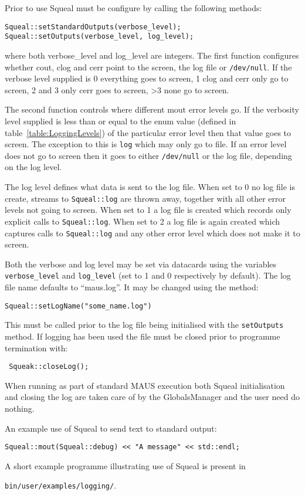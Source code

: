 Prior to use Squeal must be configure by calling the following methods:

\begin{lstlisting}
Squeal::setStandardOutputs(verbose_level);
Squeal::setOutputs(verbose_level, log_level);
\end{lstlisting}

\noindent
where both verbose\_level and log\_level are integers. The first function configures whether cout, clog and cerr point to the screen, the log file or \texttt{/dev/null}. If the verbose level supplied is 0 everything goes to screen, 1 clog and cerr only go to screen, 2 and 3 only cerr goes to screen, >3 none go to screen.

The second function controls where different mout error levels go. If the verbosity level supplied is less than or equal to the enum value (defined in table~\ref{table:LoggingLevels}) of the particular error level then that value goes to screen. The exception to this is \texttt{log} which may only go to file. If an error level does not go to screen then it goes to either \texttt{/dev/null} or the log file, depending on the log level.

The log level defines what data is sent to the log file. When set to 0 no log file is create, streams to \texttt{Squeal::log} are thrown away, together with all other error levels not going to screen. When set to 1 a log file is created which records only explicit calls to \texttt{Squeal::log}. When set to 2 a log file is again created which captures calls to \texttt{Squeal::log} and any other error level which does not make it to screen. 

Both the verbose and log level may be set via datacards using the variables \texttt{verbose\_level} and \texttt{log\_level} (set to 1 and 0 respectively by default). The log file name defaults to ``maus.log''. It may be changed using the method:

\begin{lstlisting}
Squeal::setLogName("some_name.log")
\end{lstlisting}

\noindent
This must be called prior to the log file being initialised with the \texttt{setOutputs} method. If logging has been used the file must be closed prior to programme termination with:

\begin{lstlisting}
 Squeak::closeLog();
\end{lstlisting}

When running as part of standard MAUS execution both Squeal initialisation and closing the log are taken care of by the GlobalsManager and the user need do nothing.

An example use of Squeal to send text to standard output:

\begin{lstlisting}
Squeal::mout(Squeal::debug) << "A message" << std::endl;
\end{lstlisting}

A short example programme illustrating use of Squeal is present in

\noindent
\texttt{bin/user/examples/logging/}.
